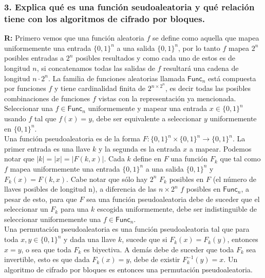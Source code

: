 \documentclass[12pt]{article}
\begin{document}
\subsubsection*{3. Explica qué es una función seudoaleatoria y qué relación tiene con los algoritmos de cifrado por bloques.}

\textbf{R:} Primero vemos que una función aleatoria $f$ se define como aquella que mapea uniformemente una entrada $\{0, 1\}^n$ a una salida $\{0, 1\}^n$, por lo tanto $f$ mapea $2^n$ posibles entradas a $2^n$ posibles resultados y como cada uno de estos es de longitud $n$, si concatenamos todas las salidas de $f$ resultará una cadena de longitud $n \cdot 2^n$. La familia de funciones aleatorias llamada $\textsf{Func}_n$ está compuesta por funciones $f$ y tiene cardinalidad finita de $2^{n\times2^n}$, es decir todas las posibles combinaciones de funciones $f$ vistas con la representación ya mencionada. Seleccionar una $f \in \textsf{Func}_n$ uniformemente  y mapear una entrada $x \in \{0, 1\}^n$ usando $f$ tal que $f(x) = y$, debe ser equivalente a seleccionar $y$ uniformemente en $\{0, 1\}^n$. \\

Una función pseudoaleatoria es de la forma $F : \{0, 1\}^n \times \{0, 1\}^n \rightarrow \{0, 1\}^n$. La primer entrada es una llave $k$ y la segunda es la entrada $x$ a mapear. Podemos notar que $|k| = |x| = |F(k,x)|$. Cada $k$ define en $F$ una función $F_k$ que tal como $f$ mapea uniformemente una entrada $\{0, 1\}^n$ a una salida $\{0, 1\}^n$ y $F_k(x) = F(k, x)$. Cabe notar que sólo hay $2^n$ $F_k$ posibles en $F$ (el número de llaves posibles de longitud n), a diferencia de las $n\times2^n$ $f$ posibles en $\textsf{Func}_n$, a pesar de esto, para que $F$ sea una función pseudoaleatoria debe de suceder que el seleccionar un $F_k$ para una $k$ escogida uniformemente, debe ser indistinguible de seleccionar uniformemente una $f \in \textsf{Func}_n$. \\

Una permutación pseudoaleatoria es una función pseudoaleatoria tal que para toda $x, y \in \{0, 1\}^n$ y dada una llave $k$, sucede que si $F_k(x) = F_k(y)$, entonces $x = y$, o sea que toda $F_k$ es biyectiva. A demás debe de suceder que toda $F_k$ sea invertible, esto es que dada $F_k(x) = y$, debe de existir $F_k^{-1}(y) = x$. Un algoritmo de cifrado por bloques es entonces una permutación pseudoaleatoria.
\end{document}
